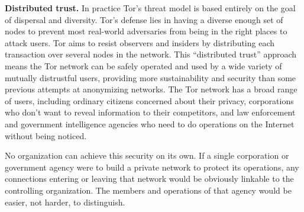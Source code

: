 \documentclass{llncs}
\begin{document}



\medskip
\noindent
{\bf Distributed trust.}
In practice Tor's threat model is based entirely on the goal of
dispersal and diversity.
Tor's defense lies in having a diverse enough set of nodes
to prevent most real-world
adversaries from being in the right places to attack users.
Tor aims to resist observers and insiders by distributing each transaction
over several nodes in the network.  This ``distributed trust'' approach
means the Tor network can be safely operated and used by a wide variety
of mutually distrustful users, providing more sustainability and security
than some previous attempts at anonymizing networks.
The Tor network has a broad range of users, including ordinary citizens
concerned about their privacy, corporations
who don't want to reveal information to their competitors, and law
enforcement and government intelligence agencies who need
to do operations on the Internet without being noticed.

No organization can achieve this security on its own.  If a single
corporation or government agency were to build a private network to
protect its operations, any connections entering or leaving that network
would be obviously linkable to the controlling organization.  The members
and operations of that agency would be easier, not harder, to distinguish.
\end{document}
